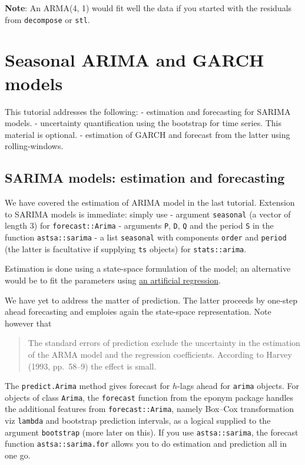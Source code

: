 \documentclass[]{book}
\begin{document}
\textbf{Note}: An ARMA(4, 1) would fit well the data if you started with
the residuals from \texttt{decompose} or \texttt{stl}.

\chapter{Seasonal ARIMA and GARCH
models}\label{seasonal-arima-and-garch-models}

This tutorial addresses the following: - estimation and forecasting for
SARIMA models. - uncertainty quantification using the bootstrap for time
series. This material is optional. - estimation of GARCH and forecast
from the latter using rolling-windows.

\section{SARIMA models: estimation and
forecasting}\label{sarima-models-estimation-and-forecasting}

We have covered the estimation of ARIMA model in the last tutorial.
Extension to SARIMA models is immediate: simply use - argument
\texttt{seasonal} (a vector of length 3) for \texttt{forecast::Arima} -
arguments \texttt{P}, \texttt{D}, \texttt{Q} and the period \texttt{S}
in the function \texttt{astsa::sarima} - a list \texttt{seasonal} with
components \texttt{order} and \texttt{period} (the latter is facultative
if supplying \texttt{ts} objects) for \texttt{stats::arima}.

Estimation is done using a state-space formulation of the model; an
alternative would be to fit the parameters using
\href{http://russell-davidson.arts.mcgill.ca/e761/mlzero3.pdf}{an
artificial regression}.

We have yet to address the matter of prediction. The latter proceeds by
one-step ahead forecasting and emploies again the state-space
representation. Note however that

\begin{quote}
The standard errors of prediction exclude the uncertainty in the
estimation of the ARMA model and the regression coefficients. According
to Harvey (1993, pp.~58--9) the effect is small.
\end{quote}

The \texttt{predict.Arima} method gives forecast for \(h\)-lags ahead
for \texttt{arima} objects. For objects of class \texttt{Arima}, the
\texttt{forecast} function from the eponym package handles the
additional features from \texttt{forecast::Arima}, namely Box--Cox
transformation viz \texttt{lambda} and bootstrap prediction intervals,
as a logical supplied to the argument \texttt{bootstrap} (more later on
this). If you use \texttt{astsa::sarima}, the forecast function
\texttt{astsa::sarima.for} allows you to do estimation and prediction
all in one go.
\end{document}

